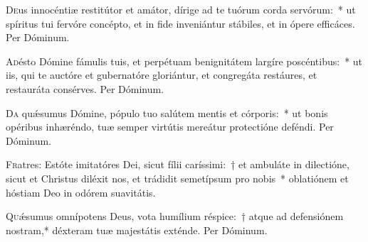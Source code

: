 \documentclass[vesperale_romanum.tex]{subfiles}
\begin{document}
\oratio

\lettrine{D}{e}us innocéntiæ restitútor et amátor, dírige ad te tuórum corda servórum:~* ut spíritus tui fervóre concépto, et in fide inveniántur stábiles, et in ópere efficáces. Per Dóminum.



\oratio

\lettrine{A}{d}ésto Dómine fámulis tuis, et perpétuam benignitátem largíre poscéntibus:~* ut iis, qui te auctóre et gubernatóre gloriántur, et congregáta restáures, et restauráta consérves. Per Dóminum.



\oratio

\lettrine{D}{a} quǽsumus Dómine, pópulo tuo salútem mentis et córporis:~* ut bonis opéribus inhæréndo, tuæ semper virtútis mereátur protectióne deféndi. Per Dóminum.



\lettrine{F}{r}atres: Estóte imitatóres Dei, sicut fílii caríssimi:~† et ambuláte in dilectióne, sicut et Christus diléxit nos, et trádidit semetípsum pro nobis~* oblatiónem et hóstiam Deo in odórem suavitátis.



\oratio

\lettrine{Q}{u}ǽsumus omnípotens Deus, vota humílium réspice:~† atque ad defensiónem nostram,* déxteram tuæ majestátis exténde.
Per Dóminum.





\end{document}
